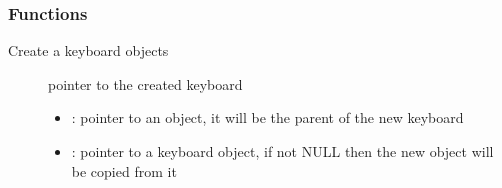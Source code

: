 \documentclass[letterpaper,10pt,english]{sphinxmanual}
\begin{document}
\begin{fulllineitems}

\begin{fulllineitems}
\label{\detokenize{object-types/kb:_CPPv422LV_KB_STYLE_BTN_TGL_PR}}%
\pysigstartmultiline
{}%
\pysigstopmultiline
\end{fulllineitems}


\begin{fulllineitems}
\label{\detokenize{object-types/kb:_CPPv419LV_KB_STYLE_BTN_INA}}%
\pysigstartmultiline
{}%
\pysigstopmultiline
\end{fulllineitems}


\end{fulllineitems}

\subsubsection*{Functions}

\begin{fulllineitems}
\label{\detokenize{object-types/kb:_CPPv412lv_kb_createP8lv_obj_tPK8lv_obj_t}}%
\pysigstartmultiline
{}\label{\detokenize{object-types/kb:lv__kb_8h_1a88131d81f7ee3785cd9af21a6191cf81}}%
\pysigstopmultiline
Create a keyboard objects \begin{description}
\item[{}] \leavevmode
pointer to the created keyboard 

\item[{}] \leavevmode\begin{itemize}
\item {} 
: pointer to an object, it will be the parent of the new keyboard 

\item {} 
: pointer to a keyboard object, if not NULL then the new object will be copied from it 

\end{itemize}

\end{description}


\end{fulllineitems}
\end{document}
